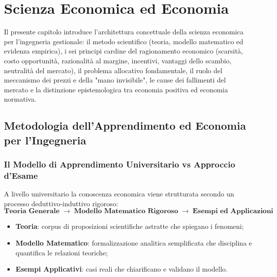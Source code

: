 \chapter{Scienza Economica ed Economia}
\label{chap:scienza_economica}

\begin{tcolorbox}[colback=navyblue!5!white, colframe=navyblue, title=\textbf{Quadro Concettuale e Obiettivi Didattici}]
Il presente capitolo introduce l'architettura concettuale della scienza economica per l'ingegneria gestionale: il metodo scientifico (teoria, modello matematico ed evidenza empirica), i sei principi cardine del ragionamento economico (scarsità, costo opportunità, razionalità al margine, incentivi, vantaggi dello scambio, neutralità del mercato), il problema allocativo fondamentale, il ruolo del meccanismo dei prezzi e della "mano invisibile", le cause dei fallimenti del mercato e la distinzione epistemologica tra economia positiva ed economia normativa.
\end{tcolorbox}

\section{Metodologia dell'Apprendimento ed Economia per l'Ingegneria}

\subsection{Il Modello di Apprendimento Universitario vs Approccio d'Esame}
A livello universitario la conoscenza economica viene strutturata secondo un processo deduttivo-induttivo rigoroso:
\begin{equation}
    \textbf{Teoria Generale} \;\longrightarrow\; \textbf{Modello Matematico Rigoroso} \;\longrightarrow\; \textbf{Esempi ed Applicazioni}
\end{equation}
\begin{itemize}
    \item \textbf{Teoria}: corpus di proposizioni scientifiche astratte che spiegano i fenomeni;
    \item \textbf{Modello Matematico}: formalizzazione analitica semplificata che disciplina e quantifica le relazioni teoriche;
    \item \textbf{Esempi Applicativi}: casi reali che chiarificano e validano il modello.
\end{itemize}

